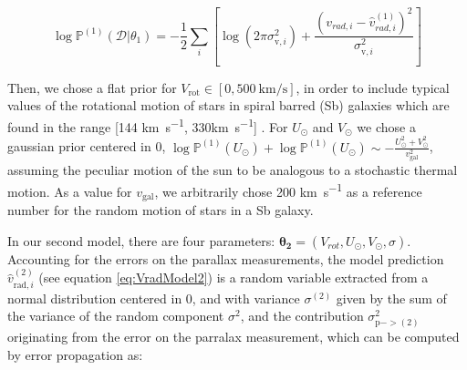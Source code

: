 \begin{equation}\label{Eq:LogLikeMod1}
    \log \mathbb{P}^{(1)}(\mathcal{D} \vert \theta_1) = -\frac{1}{2}\sum_i[\log(2\pi\sigma_{\text{v},i}^2)+\frac{(v_{rad,i} - \hat{v}_{rad,i}^{(1)})^2}{\sigma_{\text{v},i}^2}]
\end{equation}

Then, we chose a flat prior for $V_{\text{rot}}\in[0,\qty{500}{\kilo\meter\per\second}]$, 
in order to include typical values of the rotational motion of stars in spiral barred (Sb) galaxies which are found in the range [144 \unit{\kilo\meter\per\second}, 330\unit{\kilo\meter\per\second}] \cite{Schneider2015}. 
For $U_\odot$ and $V_\odot$ we chose a gaussian prior centered in 0, $\log\mathbb{P}^{(1)}(U_\odot) + \log\mathbb{P}^{(1)}(U_\odot) \sim - \frac{U_\odot^2 + V_{\odot}^2}{v_{\text{gal}}^2}$, assuming the peculiar motion of the sun to be analogous to a stochastic thermal motion. 
As a value for $v_{\text{gal}}$, we arbitrarily chose 200 \unit{\kilo\meter\per\second} as a reference number for the random motion of stars in a Sb galaxy.

In our second model, there are four parameters: $\mathbf{\theta_2} = (V_{rot}, U_{\odot}, V_{\odot}, \sigma)$. 
Accounting for the errors on the parallax measurements, the model prediction $\hat{v}^{(2)}_{\text{rad}, i}$ (see equation \ref{eq:VradModel2}) is a random variable extracted from a normal distribution centered in 0, and with variance $\sigma^(2)$ given by the sum of the variance of the random component $\sigma^2$, and the contribution $\sigma^2_{\text{p} -> (2)}$ originating from the error on the parralax measurement, which can be computed by error propagation as:

